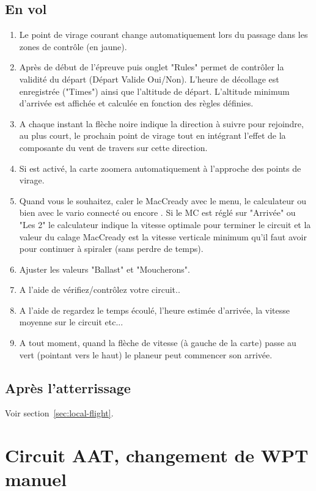 \subsection*{En vol}
\begin{enumerate}
\item  Le point de virage courant change automatiquement lors du passage dans les zones de contrôle (en jaune).
\item  Après de début de l'épreuve  \blink{}puis onglet "Rules" permet de contrôler la validité du départ (Départ Valide Oui/Non). L'heure de décollage est enregistrée ("Times") ainsi que l'altitude de départ. L'altitude minimum d'arrivée est affichée et calculée en fonction des règles définies.
\item  A chaque instant la flèche noire indique la direction à suivre pour rejoindre, au plus court,  le prochain point de virage tout en intégrant l'effet de la composante du vent de travers sur cette direction.
\item  Si  est activé, la carte zoomera automatiquement à l'approche des points de virage.
\item Quand vous le souhaitez, caler le MacCready avec le menu, le calculateur ou bien avec le vario connecté ou encore  . Si le MC est réglé sur "Arrivée" ou "Les 2" le calculateur indique la vitesse optimale pour terminer le circuit et la valeur du calage MacCready est la vitesse verticale minimum qu'il faut avoir pour continuer à spiraler (sans perdre de temps). 
\item  Ajuster les valeurs "Ballast" et "Moucherons".
\item  A l'aide de  vérifiez/contrôlez votre circuit.. 
\item  A l'aide de  regardez le temps écoulé, l'heure estimée d'arrivée, la vitesse moyenne sur le circuit etc...
\item  A tout moment, quand la flèche de vitesse (à gauche de la carte) passe au vert (pointant vers le haut) le planeur peut commencer son arrivée.
\end{enumerate}

\subsection*{Après l'atterrissage}
Voir section~\ref{sec:local-flight}.


\section{Circuit AAT, changement de WPT manuel}\label{sec:aat-task-manual}

